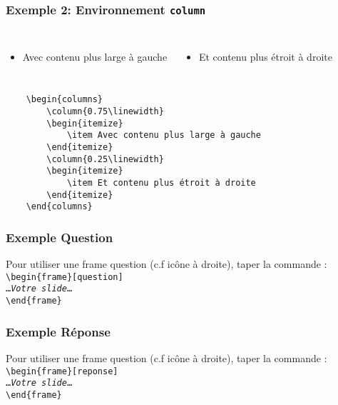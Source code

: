 \documentclass[aspectratio=169]{beamer}
\begin{document}
\begin{frame}[fragile]
    \frametitle{Exemple 2: Environnement \texttt{column}}
    \begin{columns}
        \begin{itemize}
            \item Avec contenu plus large à gauche
        \end{itemize}
        \begin{itemize}
            \item Et contenu plus étroit à droite 
        \end{itemize}
    \end{columns}
{\scriptsize
\begin{verbatim}
    \begin{columns}
        \column{0.75\linewidth}
        \begin{itemize}
            \item Avec contenu plus large à gauche
        \end{itemize}
        \column{0.25\linewidth}
        \begin{itemize}
            \item Et contenu plus étroit à droite 
        \end{itemize}
    \end{columns}
\end{verbatim}
}
\end{frame}

\begin{frame}[question]
    \frametitle{Exemple \og Question\fg}

Pour utiliser une frame question (c.f icône à droite), taper la commande :
\noindent\texttt{%
\textbackslash begin\{frame\}[question]\\
\ldots\emph{Votre slide}\ldots\\
\textbackslash end\{frame\}
}
\end{frame}

\begin{frame}[reponse]
    \frametitle{Exemple \og Réponse\fg}

Pour utiliser une frame question (c.f icône à droite), taper la commande :
\noindent\texttt{%
\textbackslash begin\{frame\}[reponse]\\
\ldots\emph{Votre slide}\ldots\\
\textbackslash end\{frame\}
}
\end{frame}
\end{document}
